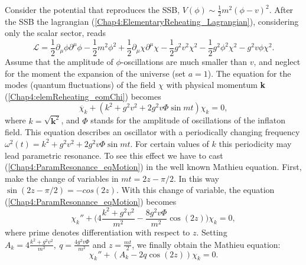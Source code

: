 \documentclass[11pt,a4paper,twoside]{book}
\begin{document}
Consider the potential that reproduces the SSB, $ V(\phi) \sim \frac{1}{2} m^{2} (\phi - v)^{2} $.  After the SSB the lagrangian (\ref{Chap4:ElementaryReheating_Lagrangian}), considering only the scalar sector, reads
\begin{equation}
\label{Chap4:ParamResonanceLagrangian}
\mathcal{L}=\frac{1}{2}\partial_{\mu}\phi\partial^{\mu}\phi -\frac{1}{2}m^{2}\phi^{2}+ \frac{1}{2}\partial_{\mu} \chi \partial^{\mu}\chi-\frac{1}{2}g^{2}v^{2}\chi^{2} - \frac{1}{2}g^{2}\phi^{2}\chi^{2}-g^{2}v\phi\chi^{2}.
\end{equation}  
Assume that the amplitude of $\phi$-oscillations are much smaller than $ v $, and neglect for the moment the expansion of the universe (set $ a=1 $). The equation for the modes (quantum fluctuations) of the field $\chi$ with physical momentum \textbf{k} (\ref{Chap4:elemReheating_eomChi}) becomes
\begin{equation}
	\label{Chap4:ParamResonance_eqMotion}
	\ddot{\chi_{k}} + (k^{2} + g^{2}v^{2} + 2g^{2}v \Phi \sin mt)\chi_{k} = 0,
\end{equation}
where $ k=\sqrt{\textbf{k}^{2}} $, and $\Phi$ stands for the amplitude of oscillations of the inflaton field. This equation describes an oscillator with a periodically changing frequency $ \omega^{2}(t) = k^{2} + g^{2}v^{2} + 2g^{2}v\Phi \sin mt $. For certain values of $ k $ this periodicity may lead parametric resonance. To see this effect we have to cast (\ref{Chap4:ParamResonance_eqMotion}) in the well known Mathieu equation. First, make the change of variables in $ mt=2z-\pi/2 $. In this way $ \sin (2z-\pi/2)=-cos (2z)  $. With this change of variable, the equation (\ref{Chap4:ParamResonance_eqMotion}) becomes
\begin{equation}
\label{Chap4:ParamResonance_eqMotion2}
\chi_{k}'' + \Bigg(4\frac{k^{2} + g^{2}v^{2}}{m^{2}}-\frac{8g^{2}v\Phi}{m^{2}} \cos(2z)\Bigg)\chi_{k} = 0,
\end{equation}
where prime denotes differentiation with respect to $ z $.
  Setting $ A_{k}=4\frac{k^{2} + g^{2}v^{2}}{m^{2}},\  q=\frac{4g^{2}v\Phi}{m^{2}} $ and $ z=\frac{mt}{2} $, we finally obtain the Mathieu equation:
\begin{equation}
	\label{Chap4:ParamResonance_MathieuEquation}
	\chi_{k}''+(A_{k} - 2q\cos(2z))\chi_{k}=0.
\end{equation}
\end{document}
